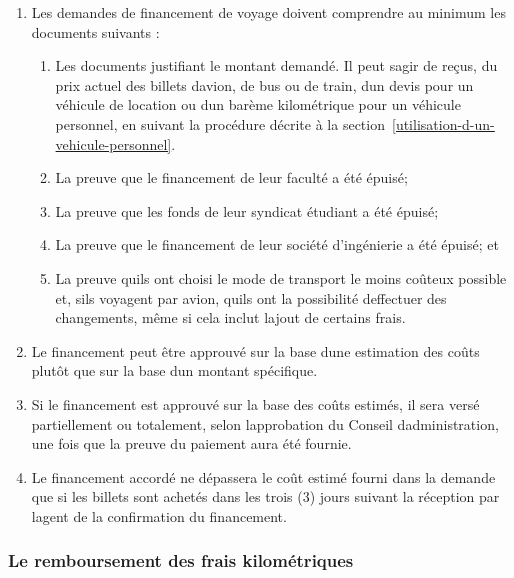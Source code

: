 \begin{enumerate}
 \item
  Les demandes de financement de voyage doivent comprendre au minimum les documents suivants :

  \begin{enumerate}
   \item
    Les documents justifiant le montant demandé. Il peut s\textquotesingle agir de reçus, du prix actuel des billets d\textquotesingle avion, de bus ou de train, d\textquotesingle un devis pour un véhicule de location ou d\textquotesingle un barème kilométrique pour un véhicule personnel, en suivant la procédure décrite à la section~\ref{utilisation-d-un-vehicule-personnel}.
   \item
    La preuve que le financement de leur faculté a été épuisé;
   \item
    La preuve que les fonds de leur syndicat étudiant a été épuisé;
   \item
    La preuve que le financement de leur société d'ingénierie a été épuisé; et
   \item
    La preuve qu\textquotesingle ils ont choisi le mode de transport le moins coûteux possible et, s\textquotesingle ils voyagent par avion, qu\textquotesingle ils ont la possibilité d\textquotesingle effectuer des changements, même si cela inclut l\textquotesingle ajout de certains frais.
  \end{enumerate}
 \item
  Le financement peut être approuvé sur la base d\textquotesingle une estimation des coûts plutôt que sur la base d\textquotesingle un montant spécifique.
 \item
  Si le financement est approuvé sur la base des coûts estimés, il sera versé partiellement ou totalement, selon l\textquotesingle approbation du Conseil d\textquotesingle administration, une fois que la preuve du paiement aura été fournie.
 \item
  Le financement accordé ne dépassera le coût estimé fourni dans la demande que si les billets sont achetés dans les trois (3) jours suivant la réception par l\textquotesingle agent de la confirmation du financement.
\end{enumerate}

\subsubsection{Le remboursement des frais kilométriques}
\label{le-remboursement-des-frais-kilometriques}

